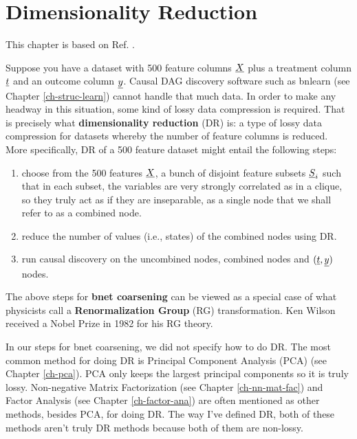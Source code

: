 \chapter{Dimensionality Reduction}
\label{ch-dim-reduc}


This chapter is based on Ref. \cite{wiki-dim-reduc}.


Suppose you have a dataset with 500 feature columns ${\underline{X}}$ plus a treatment
column ${\underline{t}}$ and an outcome column ${\underline{y}}$.
Causal DAG discovery software such as  bnlearn (see Chapter \ref{ch-struc-learn}) 
cannot handle that much data.
In order to make any headway in this situation,
some kind of lossy data compression is required. That is precisely what {\bf dimensionality reduction} (DR) is: a type
of lossy data compression for datasets whereby the number of feature columns is reduced.
More specifically, DR of a 500 feature dataset might entail the 
following steps:
\begin{enumerate}

\item choose from the 500 features ${\underline{X}}$, a bunch of disjoint feature subsets ${\underline{S}}_i$ such that in each subset, the variables are very strongly correlated as in a clique, so they truly act as if they are inseparable, as a single node that we shall refer to as a combined node.

\item reduce the number of values (i.e., states) of the combined nodes using DR.

\item run causal discovery on the uncombined nodes, combined nodes and $({\underline{t}}, {\underline{y}})$
 nodes.
\end{enumerate}

The above steps for {\bf bnet  coarsening} can be
viewed as a special case of what physicists call a {\bf Renormalization Group} (RG) transformation. Ken Wilson received a Nobel Prize in 1982 for his RG theory.

In our steps for bnet coarsening,
we did not specify how to do DR. 
The most common
method for doing DR is
Principal Component Analysis (PCA)
(see Chapter \ref{ch-pca}). PCA 
only keeps the largest principal 
components so it is truly lossy. Non-negative Matrix Factorization 
(see Chapter \ref{ch-nn-mat-fac})
and Factor Analysis (see Chapter \ref{ch-factor-ana})
are often mentioned as other
methods, besides PCA, for doing DR. The way I've
defined DR, both of these methods aren't truly DR methods because both of them are non-lossy.
